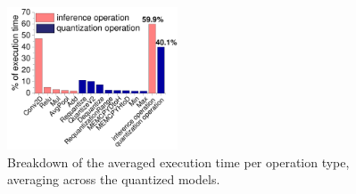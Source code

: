 \begin{figure}
\begin{center}
\includegraphics[width=0.45\textwidth]{figure/breakdown0.pdf}
\end{center}
\vspace{-2mm}
\caption{Breakdown of the averaged execution time per operation type, averaging across the quantized models.}
\label{fig:breakdown}
\end{figure}

